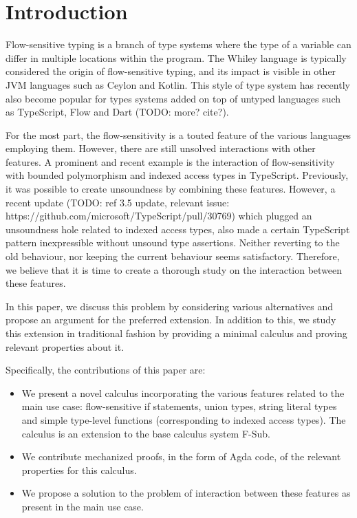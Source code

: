\section{Introduction}
\label{sec:intro}

Flow-sensitive typing is a branch of type systems where the type of a variable can differ in multiple locations within the program. The Whiley language is typically considered the origin of flow-sensitive typing, and its impact is visible in other JVM languages such as Ceylon and Kotlin. This style of type system has recently also become popular for types systems added on top of untyped languages such as TypeScript, Flow and Dart (TODO: more? cite?).

For the most part, the flow-sensitivity is a touted feature of the various languages employing them. However, there are still unsolved interactions with other features. A prominent and recent example is the interaction of flow-sensitivity with bounded polymorphism and indexed access types in TypeScript. Previously, it was possible to create unsoundness by combining these features. However, a recent update (TODO: ref 3.5 update, relevant issue: https://github.com/microsoft/TypeScript/pull/30769) which plugged an unsoundness hole related to indexed access types, also made a certain TypeScript pattern inexpressible without unsound type assertions. Neither reverting to the old behaviour, nor keeping the current behaviour seems satisfactory. Therefore, we believe that it is time to create a thorough study on the interaction between these features.

In this paper, we discuss this problem by considering various alternatives and propose an argument for the preferred extension. In addition to this, we study this extension in traditional fashion by providing a minimal calculus and proving relevant properties about it.

Specifically, the contributions of this paper are:

\begin{itemize}
\item We present a novel calculus incorporating the various features related to the main use case: flow-sensitive if statements, union types, string literal types and simple type-level functions (corresponding to indexed access types). The calculus is an extension to the base calculus system F-Sub.
\item We contribute mechanized proofs, in the form of Agda code, of the relevant properties for this calculus.
\item We propose a solution to the problem of interaction between these features as present in the main use case.
\end{itemize}

